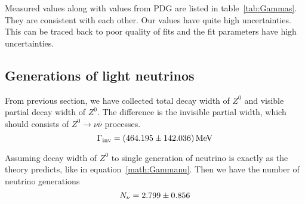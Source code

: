Measured values along with values from PDG are listed in table~\ref{tab:Gammas}. They are consistent with each other. Our values have quite high uncertainties. This can be traced back to poor quality of fits and the fit parameters have high uncertainties.

\subsection{Generations of light neutrinos}
From previous section, we have collected total decay width of $Z^0$ and visible partial decay width of $Z^0$. The difference is the invisible partial width, which should consists of $Z^0 \rightarrow \nu\bar\nu$ processes.
\begin{equation}
	\Gamma_\text{inv} = \SI{464.195 +- 142.036}{\mega\eV}
\end{equation}

Assuming decay width of $Z^0$ to single generation of neutrino is exactly as the theory predicts, like in equation~\ref{math:Gammanu}. Then we have the number of neutrino generations 
\begin{equation}
	N_{\nu} = \num{2.799 +- 0.856}
\end{equation}
